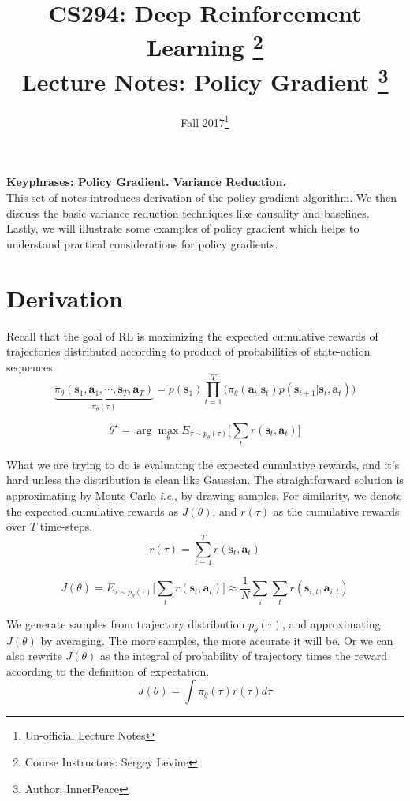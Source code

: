 \documentclass{tufte-handout}
\title{CS294: Deep Reinforcement Learning
       \thanks{Course Instructors: Sergey Levine} \\
       \Large Lecture Notes: Policy Gradient \thanks{Author: InnerPeace}}
\date{Fall 2017\thanks{Un-official Lecture Notes}} %
\newcommand{\ie}{\textit{i}.\textit{e}., }
\newcommand{\s}{\mathbf{s}}
\newcommand{\act}{\mathbf{a}}
\begin{document}
\maketitle%



\textbf{Keyphrases: Policy Gradient. Variance Reduction. }\\

\noindent{}This set of notes introduces derivation of the policy gradient algorithm. We then discuss the basic variance reduction techniques like causality and baselines. Lastly, we will illustrate some examples of policy gradient which helps to understand practical considerations for policy gradients.

\section{Derivation}

Recall that the goal of RL is maximizing the expected cumulative rewards of trajectories distributed according to product of probabilities of state-action sequences:
\begin{equation}
\label{eq:1}
\underbrace{\pi_\theta(\s_1, \act_1, \cdots , \s_T, \act_T)}_{\pi_\theta (\tau)} =
  p(\s_1) \prod _{t=1}^T \big(\pi_\theta (\act_t | \s_t) p(\s_{t+1} | \s_t, \act_t)\big)
\end{equation}

\begin{equation}
\label{eq:2}
\theta^\star = \arg \max_\theta E_{\tau \sim p_\theta(\tau) }\Big[ \sum_t r(\s_t, \act_t) \Big]
\end{equation}

What we are trying to do is evaluating the expected cumulative rewards, and it's hard unless the distribution is clean like Gaussian. The straightforward solution is approximating by Monte Carlo \ie by drawing samples. For similarity, we denote the expected cumulative rewards as $J(\theta)$, and $r(\tau)$ as
the cumulative rewards over $T$ time-steps.
\[
r(\tau) = \sum_{t=1} ^ T r(\s_t, \act_t)
\]

\begin{equation}
\label{eq:3}
J(\theta) = E_{\tau \sim p_\theta(\tau) }\Big[ \sum_t r(\s_t, \act_t) \Big]
 \approx \frac{1}{N} \sum_i \sum_t r(\s_{i,t}, \act_{i,t})
\end{equation}

We generate samples from trajectory distribution $p_\theta(\tau)$, and approximating $J(\theta)$ by averaging. The more samples, the more accurate it
will be. Or we can also rewrite $J(\theta)$ as the integral of probability of trajectory times the reward according to the definition of expectation.
\begin{equation}
\label{eq:4}
J(\theta) = \int \pi_\theta (\tau) r(\tau) d\tau
\end{equation}
\end{document}
